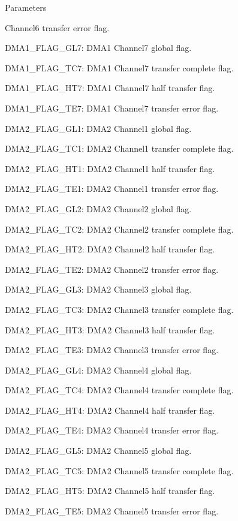 \begin{DoxyParams}{Parameters}
\begin{DoxyItemize}
Channel6 transfer error flag. \item D\+M\+A1\+\_\+\+F\+L\+A\+G\+\_\+\+G\+L7\+: D\+M\+A1 Channel7 global flag. \item D\+M\+A1\+\_\+\+F\+L\+A\+G\+\_\+\+T\+C7\+: D\+M\+A1 Channel7 transfer complete flag. \item D\+M\+A1\+\_\+\+F\+L\+A\+G\+\_\+\+H\+T7\+: D\+M\+A1 Channel7 half transfer flag. \item D\+M\+A1\+\_\+\+F\+L\+A\+G\+\_\+\+T\+E7\+: D\+M\+A1 Channel7 transfer error flag. \item D\+M\+A2\+\_\+\+F\+L\+A\+G\+\_\+\+G\+L1\+: D\+M\+A2 Channel1 global flag. \item D\+M\+A2\+\_\+\+F\+L\+A\+G\+\_\+\+T\+C1\+: D\+M\+A2 Channel1 transfer complete flag. \item D\+M\+A2\+\_\+\+F\+L\+A\+G\+\_\+\+H\+T1\+: D\+M\+A2 Channel1 half transfer flag. \item D\+M\+A2\+\_\+\+F\+L\+A\+G\+\_\+\+T\+E1\+: D\+M\+A2 Channel1 transfer error flag. \item D\+M\+A2\+\_\+\+F\+L\+A\+G\+\_\+\+G\+L2\+: D\+M\+A2 Channel2 global flag. \item D\+M\+A2\+\_\+\+F\+L\+A\+G\+\_\+\+T\+C2\+: D\+M\+A2 Channel2 transfer complete flag. \item D\+M\+A2\+\_\+\+F\+L\+A\+G\+\_\+\+H\+T2\+: D\+M\+A2 Channel2 half transfer flag. \item D\+M\+A2\+\_\+\+F\+L\+A\+G\+\_\+\+T\+E2\+: D\+M\+A2 Channel2 transfer error flag. \item D\+M\+A2\+\_\+\+F\+L\+A\+G\+\_\+\+G\+L3\+: D\+M\+A2 Channel3 global flag. \item D\+M\+A2\+\_\+\+F\+L\+A\+G\+\_\+\+T\+C3\+: D\+M\+A2 Channel3 transfer complete flag. \item D\+M\+A2\+\_\+\+F\+L\+A\+G\+\_\+\+H\+T3\+: D\+M\+A2 Channel3 half transfer flag. \item D\+M\+A2\+\_\+\+F\+L\+A\+G\+\_\+\+T\+E3\+: D\+M\+A2 Channel3 transfer error flag. \item D\+M\+A2\+\_\+\+F\+L\+A\+G\+\_\+\+G\+L4\+: D\+M\+A2 Channel4 global flag. \item D\+M\+A2\+\_\+\+F\+L\+A\+G\+\_\+\+T\+C4\+: D\+M\+A2 Channel4 transfer complete flag. \item D\+M\+A2\+\_\+\+F\+L\+A\+G\+\_\+\+H\+T4\+: D\+M\+A2 Channel4 half transfer flag. \item D\+M\+A2\+\_\+\+F\+L\+A\+G\+\_\+\+T\+E4\+: D\+M\+A2 Channel4 transfer error flag. \item D\+M\+A2\+\_\+\+F\+L\+A\+G\+\_\+\+G\+L5\+: D\+M\+A2 Channel5 global flag. \item D\+M\+A2\+\_\+\+F\+L\+A\+G\+\_\+\+T\+C5\+: D\+M\+A2 Channel5 transfer complete flag. \item D\+M\+A2\+\_\+\+F\+L\+A\+G\+\_\+\+H\+T5\+: D\+M\+A2 Channel5 half transfer flag. \item D\+M\+A2\+\_\+\+F\+L\+A\+G\+\_\+\+T\+E5\+: D\+M\+A2 Channel5 transfer error flag. \end{DoxyItemize}
\\
\hline
\end{DoxyParams}

